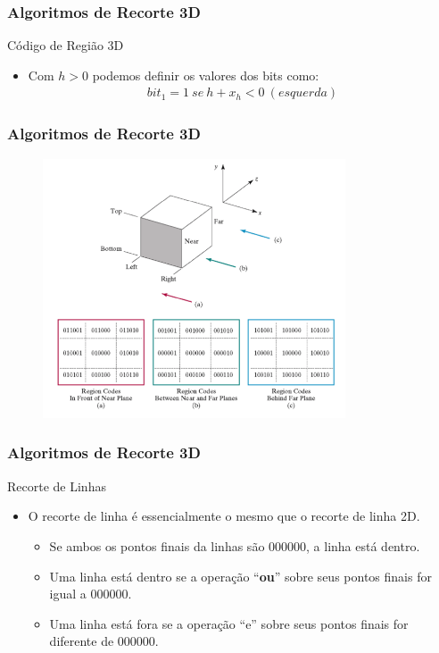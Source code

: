 \documentclass{beamer}
\begin{document}
\begin{frame}
\frametitle{Algoritmos de Recorte 3D}
	\begin{block}{Código de Região 3D}
		\begin{itemize}
			\item Com $h>0$ podemos definir os valores dos bits como:
			\begin{eqnarray*}
				bit_1 = 1 \: se \: h + x_h < 0 \:(esquerda)
			\end{eqnarray*}
		\end{itemize}	
	\end{block}
\end{frame}

\begin{frame}
\frametitle{Algoritmos de Recorte 3D}
	\begin{figure}[!h]
			\begin{center}
			\includegraphics[width=0.8\textwidth]{Figures/CodCoo}
			\end{center}
	\end{figure}
\end{frame}

\begin{frame}
\frametitle{Algoritmos de Recorte 3D}
	\begin{block}{Recorte de Linhas}
		\begin{itemize}
			\item O recorte de linha é essencialmente o mesmo que o recorte de linha 2D.
			\begin{itemize}
				\item Se ambos os pontos finais da linhas são 000000, a linha está dentro.
				\item Uma linha está dentro se a operação ``\textbf{ou}'' sobre seus pontos finais for igual a 000000.
				\item Uma linha está fora se a operação ``e'' sobre seus pontos finais for diferente de 000000. 
			\end{itemize}			 
		\end{itemize}	
	\end{block}
\end{frame}
\end{document}
